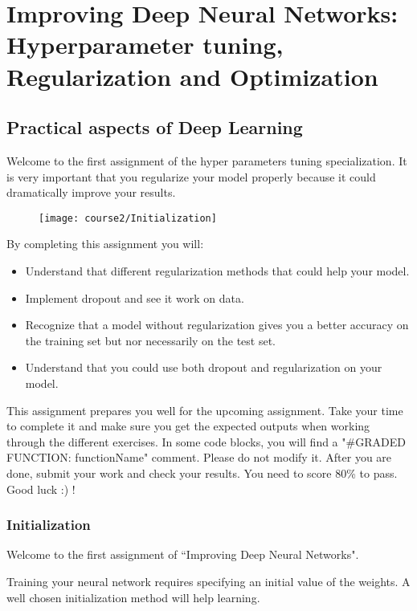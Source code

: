 \section{Improving Deep Neural Networks: Hyperparameter tuning, Regularization and Optimization}

\subsection{Practical aspects of Deep Learning}

Welcome to the first assignment of the hyper parameters tuning specialization. It is very important that you regularize your model properly because it could dramatically improve your results.
\begin{figure}[h]
\begin{center}
\texttt{[image: course2/Initialization]}
\end{center}
\end{figure}

By completing this assignment you will:
\begin{itemize}
\item Understand that different regularization methods that could help your model.
\item Implement dropout and see it work on data.
\item Recognize that a model without regularization gives you a better accuracy on the training set but nor necessarily on the test set.
\item Understand that you could use both dropout and regularization on your model.
\end{itemize}

This assignment prepares you well for the upcoming assignment. Take your time to complete it and make sure you get the expected outputs when working through the different exercises. In some code blocks, you will find a "\#GRADED FUNCTION: functionName" comment. Please do not modify it. After you are done, submit your work and check your results. You need to score 80\% to pass. Good luck :) !


\subsubsection{Initialization}

Welcome to the first assignment of ``Improving Deep Neural Networks".

Training your neural network requires specifying an initial value of the weights. A well chosen initialization method will help learning.

